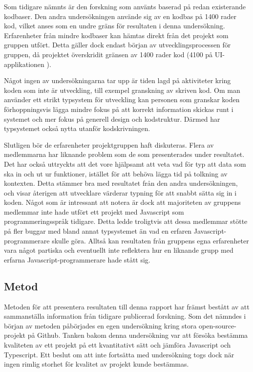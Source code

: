Som tidigare nämnts är den forskning som använts baserad på redan existerande kodbaser. Den andra undersökningen använde sig av en kodbas på 1400 rader kod, vilket anses som en undre gräns för resultaten i denna undersökning. Erfarenheter från mindre kodbaser kan hämtas direkt från det projekt som gruppen utfört. Detta gäller dock endast början av utvecklingsprocessen för gruppen, då projektet överskridit gränsen av 1400 rader kod (4100 på UI-applikationen \cite{current-ui-commit}).

Något ingen av undersökningarna tar upp är tiden lagd på aktiviteter kring koden som inte är utveckling, till exempel granskning av skriven kod. Om man använder ett strikt typsystem för utveckling kan personen som granskar koden förhoppningsvis lägga mindre fokus på att korrekt information skickas runt i systemet och mer fokus på generell design och kodstruktur. Därmed har typsystemet också nytta utanför kodskrivningen.

Slutligen bör de erfarenheter projektgruppen haft diskuteras. Flera av medlemmarna har liknande problem som de som presenterades under resultatet. Det har också uttryckts att det vore hjälpsamt att veta vad för typ att data som ska in och ut ur funktioner, istället för att behöva lägga tid på tolkning av kontexten. Detta stämmer bra med resultatet från den andra undersökningen, och visar återigen att utvecklare värderar typning för att snabbt sätta sig in i koden. Något som är intressant att notera är dock att majoriteten av gruppens medlemmar inte hade utfört ett projekt med Javascript som programmeringsspråk tidigare. Detta ledde troligtvis att dessa medlemmar stötte på fler buggar med bland annat typsystemet än vad en erfaren Javascript-programmerare skulle göra. Alltså kan resultaten från gruppens egna erfarenheter vara något partiska och eventuellt inte reflektera hur en liknande grupp med erfarna Javascript-programmerare hade stått sig.

\subsection{Metod}
\label{subsec:alexander-discussion-method}

Metoden för att presentera resultaten till denna rapport har främst bestått av att sammanställa information från tidigare publicerad forskning. Som det nämndes i början av metoden påbörjades en egen undersökning kring stora open-source-projekt på Github. Tanken bakom denna undersökning var att försöka bestämma kvaliteten av ett projekt på ett kvantitativt sätt och jämföra Javascript och Typescript. Ett beslut om att inte fortsätta med undersökning togs dock när ingen rimlig storhet för kvalitet av projekt kunde bestämmas.

